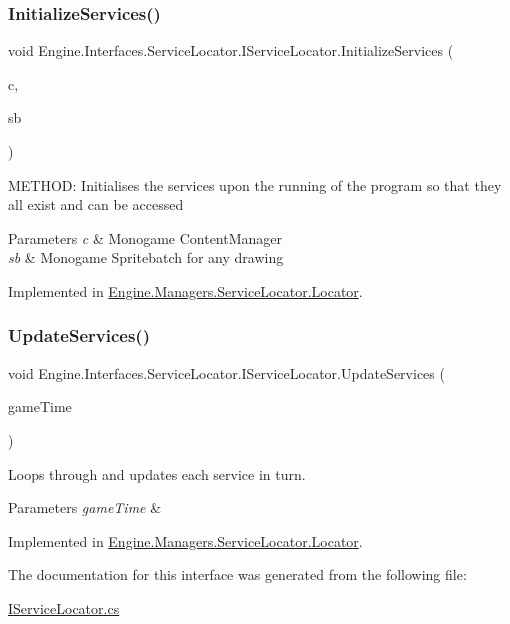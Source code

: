 \subsubsection{\texorpdfstring{Initialize\+Services()}{InitializeServices()}}
{\footnotesize\ttfamily void Engine.\+Interfaces.\+Service\+Locator.\+I\+Service\+Locator.\+Initialize\+Services (\begin{DoxyParamCaption}\item[{Content\+Manager}]{c,  }\item[{Sprite\+Batch}]{sb }\end{DoxyParamCaption})}



M\+E\+T\+H\+OD\+: Initialises the services upon the running of the program so that they all exist and can be accessed 


\begin{DoxyParams}{Parameters}
{\em c} & Monogame Content\+Manager\\
\hline
{\em sb} & Monogame Spritebatch for any drawing\\
\hline
\end{DoxyParams}


Implemented in \hyperlink{a00542_a34bc6f5d735512bae556d2ec65a7bda7}{Engine.\+Managers.\+Service\+Locator.\+Locator}.

\mbox{\label{a00474_a5bf3aab2adcf14c813a348325003ddcc}} 
\subsubsection{\texorpdfstring{Update\+Services()}{UpdateServices()}}
{\footnotesize\ttfamily void Engine.\+Interfaces.\+Service\+Locator.\+I\+Service\+Locator.\+Update\+Services (\begin{DoxyParamCaption}\item[{Game\+Time}]{game\+Time }\end{DoxyParamCaption})}



Loops through and updates each service in turn. 


\begin{DoxyParams}{Parameters}
{\em game\+Time} & \\
\hline
\end{DoxyParams}


Implemented in \hyperlink{a00542_ab66a423db26d79e6fc655df699a64f0c}{Engine.\+Managers.\+Service\+Locator.\+Locator}.



The documentation for this interface was generated from the following file\+:\begin{DoxyCompactItemize}
\item 
\hyperlink{a00137}{I\+Service\+Locator.\+cs}\end{DoxyCompactItemize}
